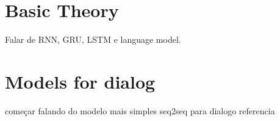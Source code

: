 \chapter{Basic Theory}\label{basic}

Falar de RNN, GRU, LSTM e language model.

\chapter{Models for dialog}\label{dialmodel}

começar falando do modelo mais simples seq2seq para dialogo referencia \cite{Sustskever}